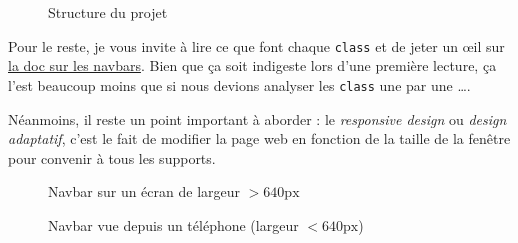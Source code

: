 \begin{figure}[!h]
\begin{minipage}{0.28\textwidth}
         \caption{\newline Structure du projet}
    \end{minipage}
\end{figure}

Pour le reste, je vous invite à lire ce que font chaque \verb|class| et de jeter un œil sur \href{https://getTailwind.com/docs/5.3/components/navbar/}{la doc \tailwind{} sur les navbars}. Bien que ça soit indigeste lors d'une première lecture, ça l'est beaucoup moins que si nous devions analyser les \verb|class| une par une \ldots.

Néanmoins, il reste un point important à aborder : le \textit{responsive design} ou \textit{design adaptatif}, c'est le fait de modifier la page web en fonction de la taille de la fenêtre pour convenir à tous les supports.

\newpage

\begin{figure}[!h]
    \centering
        \caption{Navbar sur un écran de largeur $>640\mathrm{px}$}
\end{figure}
\begin{figure}[!h]
        \centering
        \caption[La couleur rouge est obtenue en remplaçant les mentions \texttt{indigo} par \texttt{red} dans \texttt{ResponsiveNavLink.tsx}]{Navbar vue depuis un téléphone (largeur $<640\mathrm{px}$) \footnotemark}
\end{figure}

\newpage
